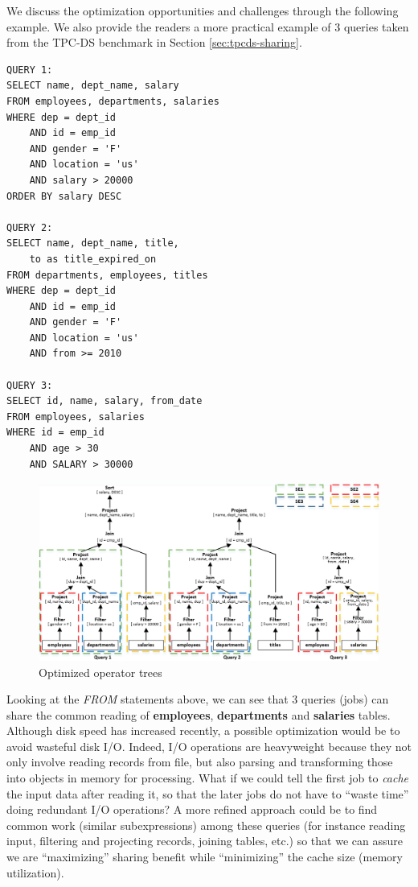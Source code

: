 We discuss the optimization opportunities and challenges through the following example. We also provide the readers a more practical example of 3 queries taken from the TPC-DS benchmark \cite{tpcds} in Section \ref{sec:tpcds-sharing}.

\begingroup
\fontsize{8pt}{9pt}
\selectfont
\begin{verbatim}
QUERY 1:
SELECT name, dept_name, salary
FROM employees, departments, salaries
WHERE dep = dept_id
	AND id = emp_id
	AND gender = 'F'
	AND location = 'us'
	AND salary > 20000
ORDER BY salary DESC

QUERY 2:
SELECT name, dept_name, title, 
	to as title_expired_on
FROM departments, employees, titles
WHERE dep = dept_id
	AND id = emp_id
	AND gender = 'F'
	AND location = 'us'
	AND from >= 2010

QUERY 3:
SELECT id, name, salary, from_date
FROM employees, salaries
WHERE id = emp_id
	AND age > 30
	AND SALARY > 30000
\end{verbatim}
\endgroup

\begin{figure}[htbp]
	\centering
	\includegraphics[scale=0.65]{figures/common_sub}
	\caption{Optimized operator trees} 
	\label{fig:common_sub}
\end{figure}

Looking at the \emph{FROM} statements above, we can see that 3 queries (jobs) can share the common reading of \textbf{employees}, \textbf{departments} and \textbf{salaries} tables. Although disk speed has increased recently, a possible optimization would be to avoid wasteful disk I/O. Indeed, I/O operations are heavyweight because they not only involve reading records from file, but also parsing and transforming those into objects in memory for processing. What if we could tell the first job to \emph{cache} the input data after reading it, so that the later jobs do not have to ``waste time'' doing redundant I/O operations? A more refined approach could be to find common work (similar subexpressions) among these queries (for instance reading input, filtering and projecting records, joining tables, etc.) so that we can assure we are ``maximizing'' sharing benefit while ``minimizing'' the cache size (memory utilization).

